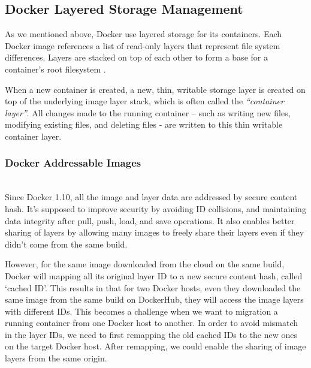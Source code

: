 
\subsection{Docker Layered Storage Management}\label{aufsIntroduction}

As we mentioned above, Docker use layered storage for its containers. Each Docker image references a list of read-only layers that represent file system differences. Layers are stacked on top of each other to form a base for a container’s root filesystem \cite{dockerlayer}. 


When a new container is created, a new, thin, writable storage layer is created on top of the underlying image layer stack, which is often called the \textit{``container layer''}. All changes made to the running container -- such as writing new files, modifying existing files, and deleting files - are written to this thin writable container layer\cite{dockerlayer}.
 



\subsubsection{Docker Addressable Images}~\\
Since Docker 1.10, all the image and layer data are addressed by secure content hash. It's supposed to improve security by avoiding ID collisions, and maintaining data integrity after pull, push, load, and save operations. It also enables better sharing of layers by allowing many images to freely share their layers even if they didn’t come from the same build\cite{dockerlayer}. 

However, for the same image downloaded from the cloud on the same build, Docker will mapping all its original layer ID to a new secure content hash, called `cached ID'. This results in that for two Docker hosts, even they downloaded the same image from the same build on DockerHub, they will access the image layers with different IDs. 
This becomes a challenge when we want to migration a running container from one Docker host to another. In order to avoid mismatch in the layer IDs, we need to first remapping the old cached IDs to the new ones on the target Docker host. After remapping, we could enable the sharing of image layers from the same origin. 



